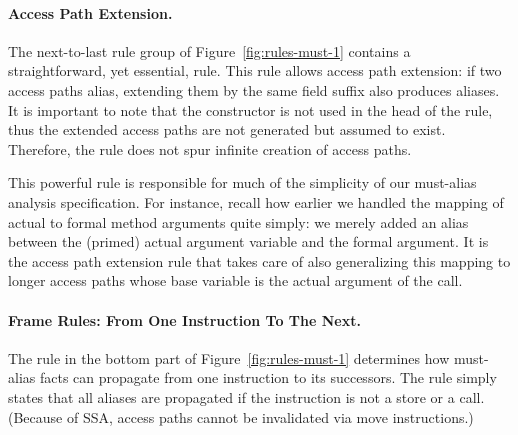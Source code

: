 \paragraph{Access Path Extension.} The next-to-last rule group of
Figure~\ref{fig:rules-must-1} contains a straightforward, yet essential, rule.
This rule allows access path extension: if two access paths alias, extending
them by the same field suffix also produces aliases. It is important to note
that the constructor  is not used in the head of the rule, thus
the extended access paths are not generated but assumed to exist.  Therefore, the
rule does not spur infinite creation of access paths.  



This powerful rule is responsible for much of the simplicity of our must-alias
analysis specification. For instance, recall how earlier we handled the mapping
of actual to formal method arguments quite simply: we merely added an alias
between the (primed) actual argument variable and the formal argument. It is
the access path extension rule that takes care of also generalizing this
mapping to longer access paths whose base variable is the actual argument of
the call.

\paragraph{Frame Rules: From One Instruction To The Next.}

The rule in the bottom part of Figure~\ref{fig:rules-must-1} determines how
must-alias facts can propagate from one instruction to its successors. The rule
simply states that all aliases are propagated if the instruction is not a store
or a call. (Because of SSA, access paths cannot be
invalidated via move instructions.)

